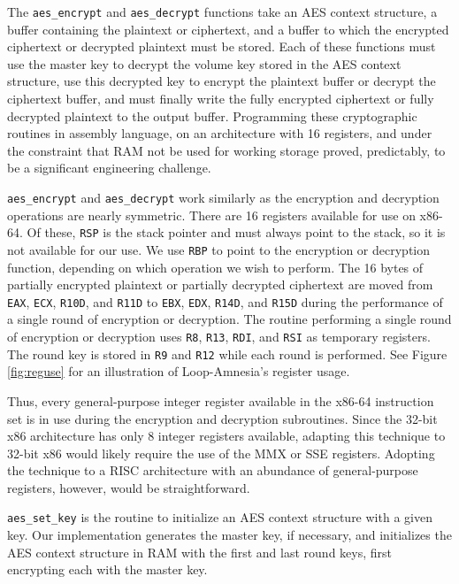 \documentclass[letterpaper,twocolumn,nonatbib,10pt]{article}
\begin{document}
The \texttt{aes\_encrypt} and \texttt{aes\_decrypt} functions take an
AES context structure, a buffer containing the plaintext or
ciphertext, and a buffer to which the encrypted ciphertext or
decrypted plaintext must be stored.  Each of these functions must use
the master key to decrypt the volume key stored in the AES context
structure, use this decrypted key to encrypt the plaintext buffer or
decrypt the ciphertext buffer, and must finally write the fully
encrypted ciphertext or fully decrypted plaintext to the output
buffer.  Programming these cryptographic routines in assembly
language, on an architecture with 16 registers, and under the
constraint that RAM not be used for working storage proved,
predictably, to be a significant engineering challenge.

\texttt{aes\_encrypt} and \texttt{aes\_decrypt} work similarly as the
encryption and decryption operations are nearly symmetric.  There are
16 registers available for use on x86-64.  Of these, \texttt{RSP} is
the stack pointer and must always point to the stack, so it is not
available for our use.  We use \texttt{RBP} to point to the encryption
or decryption function, depending on which operation we wish to
perform.  The 16 bytes of partially encrypted plaintext or partially
decrypted ciphertext are moved from \texttt{EAX}, \texttt{ECX},
\texttt{R10D}, and \texttt{R11D} to \texttt{EBX}, \texttt{EDX},
\texttt{R14D}, and \texttt{R15D} during the performance of a single
round of encryption or decryption.  The routine performing a single
round of encryption or decryption uses \texttt{R8}, \texttt{R13},
\texttt{RDI}, and \texttt{RSI} as temporary registers.  The round key
is stored in \texttt{R9} and \texttt{R12} while each round is
performed.  See Figure \ref{fig:reguse} for an illustration of
Loop-Amnesia's register usage.

Thus, every general-purpose integer register available in the x86-64
instruction set is in use during the encryption and decryption
subroutines.  Since the 32-bit x86 architecture has only 8 integer
registers available, adapting this technique to 32-bit x86 would
likely require the use of the MMX or SSE registers.  Adopting the
technique to a RISC architecture with an abundance of general-purpose
registers, however, would be straightforward.



\texttt{aes\_set\_key} is the routine to initialize an AES context
structure with a given key.  Our implementation generates the master
key, if necessary, and initializes the AES context structure in RAM
with the first and last round keys, first encrypting each with the
master key.
\end{document}
